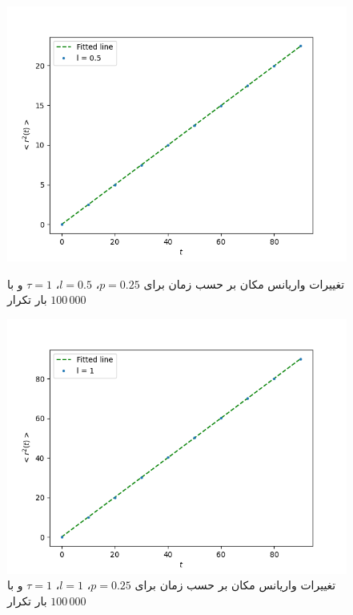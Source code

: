 \documentclass[11pt, a4paper]{article}
\begin{document}
\begin{figure}[h!]
	\centering
  \begin{minipage}[b]{0.47\textwidth}
    \includegraphics[width=\textwidth]{q5_var_0.5_100_10_100000.png}
    \caption{تغییرات واریانس مکان بر حسب زمان برای $p = 0.25$، $l = 0.5$، $\tau = 1$ و با $100\,000$ بار تکرار}
    \label{fig:q5_0.5}
  \end{minipage}
  \hfill
  \begin{minipage}[b]{0.47\textwidth}
    \includegraphics[width=\textwidth]{q5_var_1_100_10_100000.png}
    \caption{تغییرات واریانس مکان بر حسب زمان برای $p = 0.25$، $l = 1$، $\tau = 1$ و با $100\,000$ بار تکرار}
    \label{fig:q5_1}
  \end{minipage}

\end{figure}
\end{document}
